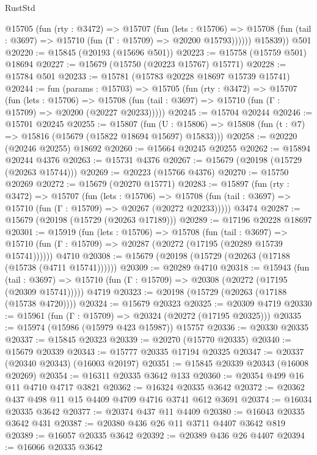 \begin{lexlean}{RustStd}
\begin{coremodule}
          @15705
            (fun (rty : @3472) =>
            @15707
              (fun (lets : @15706) =>
              @15708 (fun (tail : @3697) => @15710 (fun (Γ : @15709) => @20200 @15793))))))
        @15839))
    @501
@20220 := @15845 (@20193 (@15696 @501))
@20223 := @15758 (@15759 @501) @18694
@20227 := @15679 (@15750 (@20223 @15767) @15771)
@20228 := @15784 @501
@20233 := @15781 (@15783 @20228 @18697 @15739 @15741)
@20244 := fun (params : @15703) =>
  @15705
    (fun (rty : @3472) =>
    @15707
      (fun (lets : @15706) =>
      @15708 (fun (tail : @3697) => @15710 (fun (Γ : @15709) => @20200 (@20227 @20233)))))
@20245 := @15704 @20244
@20246 := @15701 @20245
@20255 := @15807
    (fun (U : @15806) => @15808 (fun (t : @7) => @15816 (@15679 (@15822 @18694 @15697) @15833)))
@20258 := @20220 (@20246 @20255) @18692
@20260 := @15664 @20245 @20255
@20262 := @15894 @20244 @4376
@20263 := @15731 @4376
@20267 := @15679 (@20198 (@15729 (@20263 @15744)))
@20269 := @20223 (@15766 @4376)
@20270 := @15750 @20269
@20272 := @15679 (@20270 @15771)
@20283 := @15897
    (fun (rty : @3472) =>
    @15707
      (fun (lets : @15706) =>
      @15708 (fun (tail : @3697) => @15710 (fun (Γ : @15709) => @20267 (@20272 @20233)))))
    @3474
@20287 := @15679 (@20198 (@15729 (@20263 @17189)))
@20289 := @17196 @20228 @18697
@20301 := @15919
    (fun (lets : @15706) =>
    @15708
      (fun (tail : @3697) =>
      @15710 (fun (Γ : @15709) => @20287 (@20272 (@17195 (@20289 @15739 @15741))))))
    @4710
@20308 := @15679 (@20198 (@15729 (@20263 (@17188 (@15738 (@4711 @15741))))))
@20309 := @20289 @4710
@20318 := @15943
    (fun (tail : @3697) => @15710 (fun (Γ : @15709) => @20308 (@20272 (@17195 (@20309 @15741)))))
    @4719
@20323 := @20198 (@15729 (@20263 (@17188 (@15738 @4720))))
@20324 := @15679 @20323
@20325 := @20309 @4719
@20330 := @15961 (fun (Γ : @15709) => @20324 (@20272 (@17195 @20325)))
@20335 := @15974 (@15986 (@15979 @423 @15987)) @15757
@20336 := @20330 @20335
@20337 := @15845 @20323
@20339 := @20270 (@15770 @20335)
@20340 := @15679 @20339
@20343 := @15777 @20335 @17194 @20325
@20347 := @20337 (@20340 @20343) (@16003 @20197)
@20351 := @15845 @20339 @20343 (@16008 @20269)
@20354 := @16311 @20335 @3642 @133
@20360 := @20354 @499 @16 @11 @4710 @4717 @3821
@20362 := @16324 @20335 @3642
@20372 := @20362 @437 @498 @11 @15 @4409 @4709 @4716 @3741 @612 @3691
@20374 := @16034 @20335 @3642
@20377 := @20374 @437 @11 @4409
@20380 := @16043 @20335 @3642 @431
@20387 := @20380 @436 @26 @11 @3711 @4407 @3642 @819
@20389 := @16057 @20335 @3642
@20392 := @20389 @436 @26 @4407
@20394 := @16066 @20335 @3642

\end{coremodule}
\end{lexlean}
